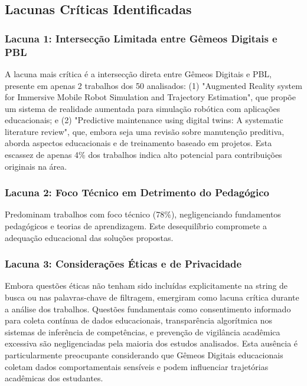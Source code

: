 \documentclass[english, spanish, brazilian]{RBIEarticle} %
\begin{document}
\subsection{Lacunas Críticas Identificadas}

\subsubsection{Lacuna 1: Intersecção Limitada entre Gêmeos Digitais e PBL}

A lacuna mais crítica é a intersecção direta entre Gêmeos Digitais e PBL, presente em apenas 2 trabalhos dos 50 analisados: (1) "Augmented Reality system for Immersive Mobile Robot Simulation and Trajectory Estimation", que propõe um sistema de realidade aumentada para simulação robótica com aplicações educacionais; e (2) "Predictive maintenance using digital twins: A systematic literature review", que, embora seja uma revisão sobre manutenção preditiva, aborda aspectos educacionais e de treinamento baseado em projetos. Esta escassez de apenas 4\% dos trabalhos indica alto potencial para contribuições originais na área.

\subsubsection{Lacuna 2: Foco Técnico em Detrimento do Pedagógico}

Predominam trabalhos com foco técnico (78\%), negligenciando fundamentos pedagógicos e teorias de aprendizagem. Este desequilíbrio compromete a adequação educacional das soluções propostas.

\subsubsection{Lacuna 3: Considerações Éticas e de Privacidade}

Embora questões éticas não tenham sido incluídas explicitamente na string de busca ou nas palavras-chave de filtragem, emergiram como lacuna crítica durante a análise dos trabalhos. Questões fundamentais como consentimento informado para coleta contínua de dados educacionais, transparência algorítmica nos sistemas de inferência de competências, e prevenção de vigilância acadêmica excessiva são negligenciadas pela maioria dos estudos analisados. Esta ausência é particularmente preocupante considerando que Gêmeos Digitais educacionais coletam dados comportamentais sensíveis e podem influenciar trajetórias acadêmicas dos estudantes.
\end{document}
